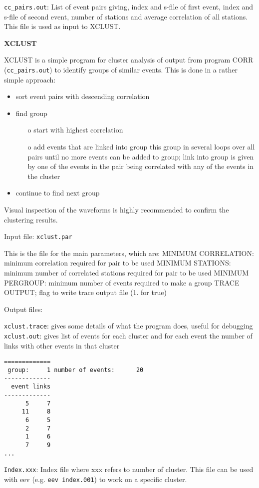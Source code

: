 \texttt{cc\_pairs.out}: List of event pairs giving, index and s-file of first event, index and s-file of second event, number of stations and average correlation of all stations. This file is used as input to XCLUST. 



\textbf{XCLUST}

XCLUST is a simple program for cluster analysis of output from program 
CORR (\texttt{cc\_pairs.out}) to identify groups of similar events. 
This is done in a rather simple approach: 

\begin{itemize}
\item
sort event pairs with descending correlation 
\item find group 
\begin{itemize}
\item[o]start with highest correlation 
\item[o]
add events that are linked into group this group in several loops over all pairs until no more events can be added to group; link into group is given by one of the events in the pair being correlated with any of the events in the cluster 
\end{itemize}
\item continue to find next group 
\end{itemize}

Visual inspection of the waveforms is highly recommended to confirm the clustering results. 

Input file: \texttt{xclust.par}

This is the file for the main parameters, which are: \newline
MINIMUM CORRELATION: minimum correlation required for pair to be used \newline
MINIMUM STATIONS: minimum number of correlated stations required for pair to be used \newline
MINIMUM PERGROUP: minimum number of events required to make a group \newline
TRACE OUTPUT; flag to write trace output file (1. for true) 

Output files: 

\texttt{xclust.trace}: gives some details of what the program does, useful for debugging \newline
\texttt{xclust.out}: gives list of events for each cluster and for each event the number of links with other events in that cluster 

\begin{verbatim}
============= 
 group:     1 number of events:      20 
-------------
  event links 
-------------
      5     7 
     11     8 
      6     5 
      2     7 
      1     6 
      7     9 
...
\end{verbatim}

\texttt{Index.xxx}: Index file where xxx refers to number of cluster. This file 
can be used with eev (e.g. \texttt{eev index.001}) to work on a specific cluster. 

